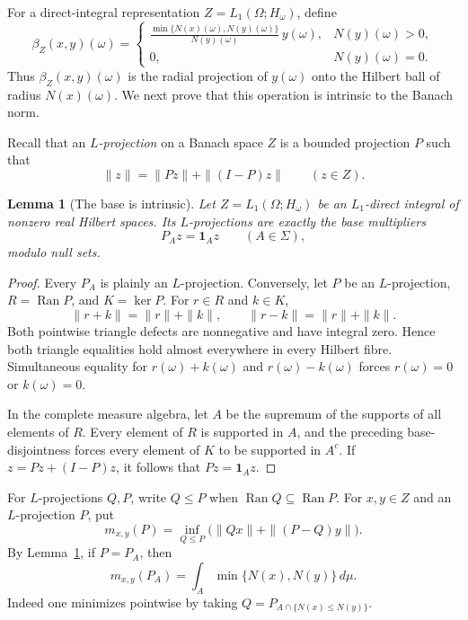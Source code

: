 \documentclass[11pt]{article}
\newcommand{\1}{\mathbf 1}
\newcommand{\Ran}{\operatorname{Ran}}
\newtheorem{lemma}[theorem]{Lemma}
\theoremstyle{definition}
\theoremstyle{remark}
\begin{document}
For a direct-integral representation $Z=L_1(\Omega;H_\omega)$, define
\begin{equation}
\label{eq:beta-def}
 \beta_Z(x,y)(\omega)=
 \begin{cases}
 \displaystyle
 \frac{\min\{N(x)(\omega),N(y)(\omega)\}}{N(y)(\omega)}\,y(\omega),
      &N(y)(\omega)>0,\\[1.2ex]
 0,   &N(y)(\omega)=0.
 \end{cases}
\end{equation}
Thus $\beta_Z(x,y)(\omega)$ is the radial projection of $y(\omega)$ onto the
Hilbert ball of radius $N(x)(\omega)$.  We next prove that this operation is
intrinsic to the Banach norm.

Recall that an \emph{$L$-projection} on a Banach space $Z$ is a bounded
projection $P$ such that
\[
          \|z\|=\|Pz\|+\|(I-P)z\|\qquad(z\in Z).
\]

\begin{lemma}[The base is intrinsic]
\label{lem:L-projections}
Let $Z=L_1(\Omega;H_\omega)$ be an $L_1$-direct integral of nonzero real
Hilbert spaces.  Its $L$-projections are exactly the base multipliers
\[
                     P_Az=\1_Az\qquad(A\in\Sigma),
\]
modulo null sets.
\end{lemma}

\begin{proof}
Every $P_A$ is plainly an $L$-projection.  Conversely, let $P$ be an
$L$-projection, $R=\Ran P$, and $K=\ker P$.  For $r\in R$ and $k\in K$,
\[
 \|r+k\|=\|r\|+\|k\|,
 \qquad
 \|r-k\|=\|r\|+\|k\|.
\]
Both pointwise triangle defects are nonnegative and have integral zero.
Hence both triangle equalities hold almost everywhere in every Hilbert
fibre.  Simultaneous equality for $r(\omega)+k(\omega)$ and
$r(\omega)-k(\omega)$ forces $r(\omega)=0$ or $k(\omega)=0$.

In the complete measure algebra, let $A$ be the supremum of the supports of
all elements of $R$.  Every element of $R$ is supported in $A$, and the
preceding base-disjointness forces every element of $K$ to be supported in
$A^c$.  If $z=Pz+(I-P)z$, it follows that $Pz=\1_Az$.
\end{proof}

For $L$-projections $Q,P$, write $Q\leq P$ when $\Ran Q\subseteq\Ran P$.
For $x,y\in Z$ and an $L$-projection $P$, put
\begin{equation}
\label{eq:meet-functional}
 m_{x,y}(P)=
 \inf_{Q\leq P}\bigl(\|Qx\|+\|(P-Q)y\|\bigr).
\end{equation}
By Lemma~\ref{lem:L-projections}, if $P=P_A$, then
\begin{equation}
\label{eq:meet-density}
       m_{x,y}(P_A)=\int_A\min\{N(x),N(y)\}\,d\mu.
\end{equation}
Indeed one minimizes pointwise by taking
$Q=P_{A\cap\{N(x)\leq N(y)\}}$.
\end{document}
